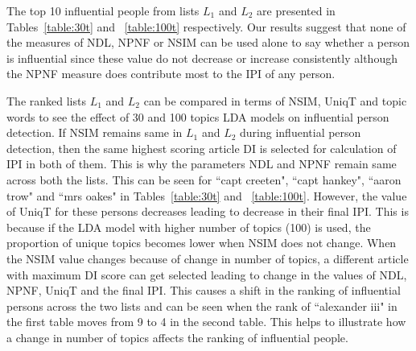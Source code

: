 
The top 10 influential people from lists $L_1$ and $L_2$ are presented in Tables~\ref{table:30t} and ~\ref{table:100t} respectively. 
Our results suggest that none of the measures of NDL, NPNF or NSIM can be used alone to say whether a person is influential since these value do not decrease or increase consistently although the NPNF measure does contribute most to the IPI of any person.

The ranked lists $L_1$ and $L_2$ can be compared in terms of NSIM, UniqT and topic words to see the effect of 30 and 100 topics LDA models on influential person detection.
 If NSIM remains same in $L_1$ and $L_2$ during influential person detection, then the same highest scoring article DI is selected for calculation of IPI in both of them. This is why the parameters NDL and NPNF remain same across both the lists. This can be seen for ``capt creeten", ``capt hankey", ``aaron trow" and ``mrs oakes" in Tables~\ref{table:30t} and ~\ref{table:100t}. However, the value of UniqT for these persons decreases leading to decrease in their final IPI. This is because if the LDA model with higher number of topics (100) is used, the proportion of unique topics becomes lower when NSIM does not change. When the NSIM value changes because of change in number of topics, a different article with maximum DI score can get selected leading to change in the values of NDL, NPNF, UniqT and the final IPI. This causes a shift in the ranking of influential persons across the two lists and can be seen when the rank of ``alexander iii" in the first table moves from 9 to 4 in the second table. 
This helps to illustrate how a change in number of topics affects the ranking of influential people.

